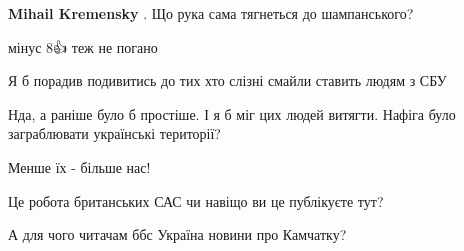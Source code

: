 \begin{itemize}
\begin{itemize}
\textbf{Mihail Kremensky} . Що рука сама тягнеться до шампанського?
\end{itemize}

 
мінус 8👍 теж не погано

 
Я б порадив подивитись до тих хто слізні смайли ставить людям з СБУ

 
Нда, а раніше було б простіше. І я б міг цих людей витягти. Нафіга було заграблювати українські території?

 
Менше їх - більше нас!

 
Це робота британських САС чи навіщо ви це публікуєте тут?

 
А для чого читачам ббс Україна новини про Камчатку?

\begin{itemize}
 

\end{itemize}
\end{itemize}
